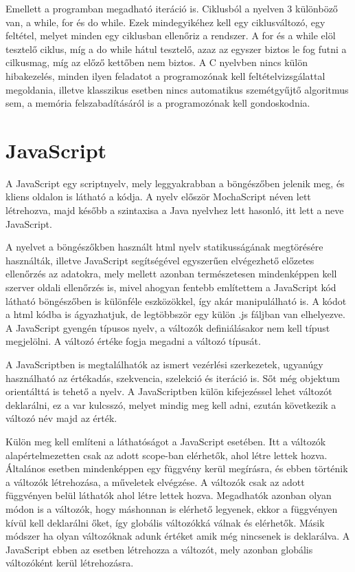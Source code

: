 Emellett a programban megadható iteráció is. Ciklusból a nyelven 3 különböző van, a while, for és do while. Ezek mindegyikéhez kell egy ciklusváltozó, egy feltétel, melyet minden egy ciklusban ellenőriz a rendszer. A for és a while elöl tesztelő ciklus, míg a do while hátul tesztelő, azaz az egyszer biztos le fog futni a cilkusmag, míg az előző kettőben nem biztos. A C nyelvben nincs külön hibakezelés, minden ilyen feladatot a programozónak kell feltételvizsgálattal megoldania, illetve klasszikus esetben nincs automatikus szemétgyűjtő algoritmus sem, a memória felszabadításáról is a programozónak kell gondoskodnia.

\section{JavaScript}

A JavaScript egy scriptnyelv, mely leggyakrabban a böngészőben jelenik meg, és kliens oldalon is látható a kódja. A nyelv először MochaScript néven lett létrehozva, majd később a szintaxisa a Java nyelvhez lett hasonló, itt lett a neve JavaScript.

A nyelvet a böngészőkben használt html nyelv statikusságának megtörésére használták, illetve JavaScript segítségével egyszerűen elvégezhető előzetes ellenőrzés az adatokra, mely mellett azonban természetesen mindenképpen kell szerver oldali ellenőrzés is, mivel ahogyan fentebb említettem a JavaScript kód látható böngészőben is különféle eszközökkel, így akár manipulálható is. A kódot a html kódba is ágyazhatjuk, de legtöbbször egy külön .js fáljban van elhelyezve. A JavaScript gyengén típusos nyelv, a változók definiálásakor nem kell típust megjelölni. A változó értéke fogja megadni a változó típusát.

A JavaScriptben is megtalálhatók az ismert vezérlési szerkezetek, ugyanúgy használható az értékadás, szekvencia, szelekció és iteráció is. Sőt még objektum orientálttá is tehető a nyelv. A JavaScriptben külön kifejezéssel lehet változót deklarálni, ez a var kulcsszó, melyet mindig meg kell adni, ezután következik a változó név majd az érték.

Külön meg kell említeni a láthatóságot a JavaScript esetében. Itt a változók alapértelmezetten csak az adott scope-ban elérhetők, ahol létre lettek hozva. Általános esetben mindenképpen egy függvény kerül megírásra, és ebben történik a változók létrehozása, a műveletek elvégzése. A változók csak az adott függvényen belül láthatók ahol létre lettek hozva. Megadhatók azonban olyan módon is a változók, hogy máshonnan is elérhető legyenek, ekkor a függvényen kívül kell deklarálni őket, így globális változókká válnak és elérhetők. Másik módszer ha olyan változóknak adunk értéket amik még nincsenek is deklarálva. A JavaScript ebben az esetben létrehozza a változót, mely azonban globális változóként kerül létrehozásra.

